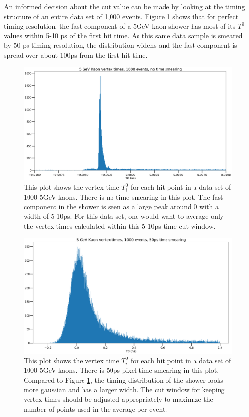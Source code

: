 \documentclass[12pt,twoside,letterpaper]{article}
\begin{document}
An informed decision about the cut value can be made by looking at the timing structure of an entire data set of 1,000 events. Figure \ref{timedist_nosmear} shows that for perfect timing resolution, the fast component of a 5GeV kaon shower has most of its $T^0$ values within 5-10 ps of the first hit time. As this same data sample is smeared by 50 ps timing resolution, the distribution widens and the fast component is spread over about 100ps from the first hit time. 

\begin{figure}[h!]
\centering
\includegraphics[width=\textwidth]{images/timedist_nosmear.png}
\caption{This plot shows the vertex time $T_i ^0$ for each hit point in a data set of 1000 5GeV kaons. There is no time smearing in this plot. The fast component in the shower is seen as a large peak around 0 with a width of 5-10ps. For this data set, one would want to average only the vertex times calculated within this 5-10ps time cut window.}\label{timedist_nosmear}
\end{figure}

\begin{figure}[h!]
\centering
\includegraphics[width=\textwidth]{images/timedist_50ps.png}
\caption{This plot shows the vertex time $T_i ^0$ for each hit point in a data set of 1000 5GeV kaons. There is 50ps pixel time smearing in this plot. Compared to Figure \ref{timedist_nosmear}, the timing distribution of the shower looks more gaussian and has a larger width. The cut window for keeping vertex times should be adjusted appropriately to maximize the number of points used in the average per event.}\label{timedist_smear}
\end{figure}
\end{document}
